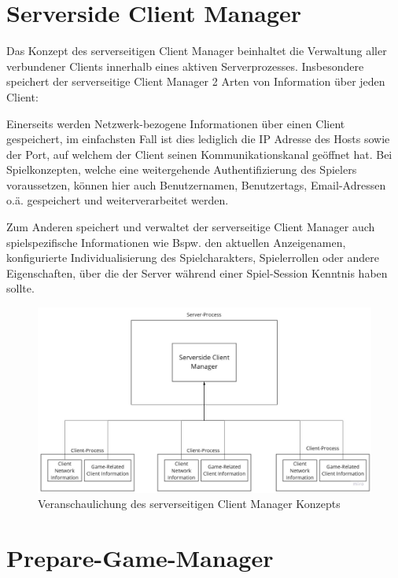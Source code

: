 \section{Serverside Client Manager}

Das Konzept des serverseitigen Client Manager beinhaltet die Verwaltung aller verbundener Clients innerhalb eines aktiven Serverprozesses. Insbesondere speichert der serverseitige Client Manager 2 Arten von Information über jeden Client:

Einerseits werden Netzwerk-bezogene Informationen über einen Client gespeichert, im einfachsten Fall ist dies lediglich die IP Adresse des Hosts sowie der Port, auf welchem der Client seinen Kommunikationskanal geöffnet hat. Bei Spielkonzepten, welche eine weitergehende Authentifizierung des Spielers voraussetzen, können hier auch Benutzernamen, Benutzertags, Email-Adressen o.ä. gespeichert und weiterverarbeitet werden.

Zum Anderen speichert und verwaltet der serverseitige Client Manager auch spielspezifische Informationen wie Bspw. den aktuellen Anzeigenamen, konfigurierte Individualisierung des Spielcharakters, Spielerrollen oder andere Eigenschaften, über die der Server während einer Spiel-Session Kenntnis haben sollte.

\begin{figure}
	\centering
	\includegraphics[width=150mm]{images/serversided_client_manager.jpg}
	\caption[Serversided Client Manager]{Veranschaulichung des serverseitigen Client Manager Konzepts}
	\label{pic:serversided_client_manager}
\end{figure}

\section{Prepare-Game-Manager}

